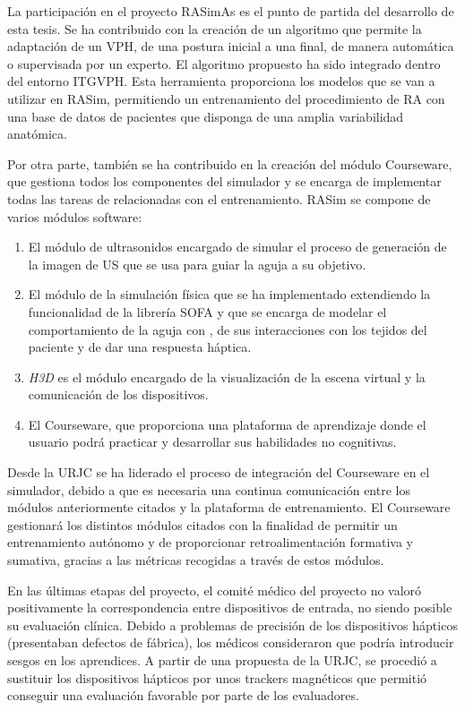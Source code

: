 La participación en el proyecto \ac{RASimAs} es el punto de partida del desarrollo de esta tesis. Se ha contribuido con la creación de un algoritmo que permite la adaptación de un \ac{VPH}, de una postura inicial a una final, de manera automática o supervisada por un experto.
El algoritmo propuesto ha sido integrado dentro del entorno \ac{ITGVPH}.
Esta herramienta proporciona los modelos que se van a utilizar en \ac{RASim}, permitiendo un entrenamiento del procedimiento de \ac{RA} con una base de datos de pacientes que disponga de una amplia variabilidad anatómica.

Por otra parte, también se ha contribuido en la creación del módulo \ac{Courseware}, que gestiona todos los componentes del simulador y se encarga de implementar todas las tareas de relacionadas con el entrenamiento. \ac{RASim} se compone de varios módulos software:
\begin{enumerate}
    \item El módulo de ultrasonidos \cite{Law2015} encargado de simular el proceso de generación de la imagen de \ac{US} que se usa para guiar la aguja a su objetivo.
    \item El módulo de la simulación física que se ha implementado extendiendo la funcionalidad de la librería \ac{SOFA} \cite{sofaweb} y que se encarga de modelar el comportamiento de la aguja con \cite{needleinsertion}, de sus interacciones con los tejidos del paciente y de dar una respuesta háptica.
    \item \emph{H3D} \cite{sensegraphics2012open} es el módulo encargado de la visualización de la escena virtual y la comunicación de los dispositivos.
    \item El \ac{Courseware}, que proporciona una plataforma de aprendizaje donde el usuario podrá practicar y desarrollar sus habilidades no cognitivas.
\end{enumerate}
Desde la \ac{URJC} se ha liderado el proceso de integración del \ac{Courseware} en el simulador, debido a que es necesaria una continua comunicación entre los módulos anteriormente citados y la plataforma de entrenamiento. El \ac{Courseware} gestionará los distintos módulos citados con la finalidad de permitir un entrenamiento autónomo y de proporcionar retroalimentación formativa y sumativa, gracias a las métricas recogidas a través de estos módulos.

En las últimas etapas del proyecto, el comité médico del proyecto no valoró positivamente la correspondencia entre dispositivos de entrada, no siendo posible su evaluación clínica. Debido a problemas de precisión de los dispositivos hápticos (presentaban defectos de fábrica), los médicos consideraron que podría introducir sesgos en los aprendices. A partir de una propuesta de la \ac{URJC}, se procedió a sustituir los dispositivos hápticos por unos \acs{tracker}s magnéticos que permitió conseguir una evaluación favorable por parte de los evaluadores.



